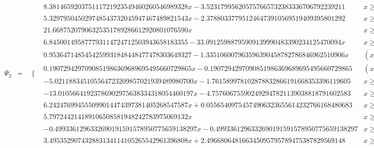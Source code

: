 \documentclass{article}
\begin{document}
\begin{landscape}
\begin{eqnarray*}
\begin{array}{cc}
\end{array}\\
\Psi_2 & = & \begin{array}{cc}
 \{ & 
\begin{array}{cc}
 8.381465920375111721923549460260546989328 x-3.523179956205757665732383336706792239211 & x\geq \frac{1}{4}\land x<\frac{3}{8} \\
 5.329795045029748543732045947467489821543 x-2.378803377951246473910569519409395801292 & x\geq \frac{3}{8}\land x<\frac{1}{2} \\
 21.66875207906325351789286612920801076590 x & x\geq 0\land x<\frac{1}{8} \\
 6.845001495877793114724712503943658183355-33.09125988795909139990483390234125470094 x & x\geq \frac{1}{8}\land x<\frac{1}{4} \\
 0.9536471485454259931848448477478303649327-1.335106007963596390458782786846962510906 x & \left(x\geq \frac{1}{2}\land x<\frac{5}{8}\right)\lor \left(x\geq \frac{5}{8}\land x<\frac{3}{4}\right) \\
 0.1907294297090851986369689695495660729865 x-0.1907294297090851986369689695495660729865 & \left(x\geq \frac{3}{4}\land x<\frac{7}{8}\right)\lor \left(x\geq \frac{7}{8}\land x<1\right) \\
 -5.021188345105564723209857021939489980700 x-1.761589978102878832866191668353396119605 & x\geq -\frac{1}{2}\land x<-\frac{3}{8} \\
 -13.01056641923786902975638334318054460197 x-4.757606755902492947821139038818791602583 & x\geq -\frac{3}{8}\land x<-\frac{1}{4} \\
 6.242476994555099014474397381405268547587 x+0.05565409754574906323655614232766168480683 & x\geq -\frac{1}{4}\land x<-\frac{1}{8} \\
 5.797244214189106508581948242783975069132 x & x\geq -\frac{1}{8}\land x<0 \\
 -0.4993361296332690191591578950775659138297 x-0.4993361296332690191591578950775659138297 & x\geq -1\land x<-\frac{3}{4} \\
 3.495352907432883134114105265542961396808 x+2.496680648166345095795789475387829569148 & x\geq -\frac{3}{4}\land x<-\frac{1}{2}
\end{array}


\end{array}
\end{eqnarray*}
\end{landscape}
\end{document}
